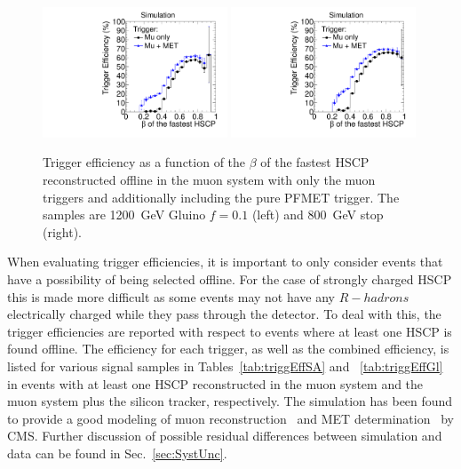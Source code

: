 \begin{figure}
\centering
  \includegraphics[clip=false, trim=0.0cm 0cm 0.0cm 0cm, width=0.49\textwidth]{figures/search/Gluino_8TeV_M1200_f10MatchedSA}
  \includegraphics[clip=false, trim=0.0cm 0cm 0.0cm 0cm, width=0.49\textwidth]{figures/search/Stop_8TeV_M800MatchedSA}
      \caption[Trigger efficiency as a function of the $\beta$ of the fastest HSCP reconstructed offline in the muon system with only the muon triggers
and additionally including the PFMET trigger.]
{Trigger efficiency as a function of the $\beta$ of the fastest HSCP reconstructed offline in the muon system with only the muon triggers
and additionally including the pure PFMET trigger.
The samples are 1200~GeV Gluino $f=0.1$ (left) and 800~GeV stop (right).}
    \label{fig:TriggerEffVsBetaGl}
\end{figure}

When evaluating trigger efficiencies, it is important to only consider events that have a possibility of being selected offline.
For the case of strongly charged HSCP this is made more difficult as some events may not have any $R-hadrons$ electrically charged while they pass through the detector.
To deal with this, the trigger efficiencies are reported with respect to events where at least one HSCP is found offline.
The efficiency for each trigger, as well as the combined efficiency, is listed for various signal samples in Tables~\ref{tab:triggEffSA} and ~\ref{tab:triggEffGl} in events
with at least one HSCP reconstructed in the muon system and the muon system plus the silicon tracker, respectively. The simulation has been found to 
provide a good modeling of  muon reconstruction~\cite{2012JInst...7P0002T} and MET determination~\cite{CMS-PAS-JME-12-002} by CMS.
Further discussion of possible residual differences between simulation and data can be found in Sec.~\ref{sec:SystUnc}.


